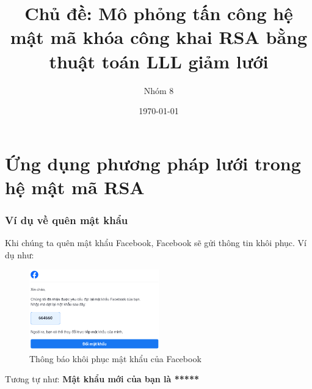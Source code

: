 \documentclass{beamer}
\title[{\makebox[.15\paperwidth]{MI4100 - Mật mã và độ phức tạp thuật toán}}]{Chủ đề: Mô phỏng tấn công hệ mật mã khóa công khai RSA bằng thuật toán LLL giảm lưới}
\author[Nhóm 8]{Nhóm 8}
\date[\today]{\today}
\numberwithin{equation}{section}
\begin{document}
\begin{frame}
\titlepage
\end{frame}






 
\section{Ứng dụng phương pháp lưới trong hệ mật mã RSA}
\begin{frame}
    \frametitle{Ví dụ về quên mật khẩu}
    Khi chúng ta quên mật khẩu Facebook, Facebook sẽ gửi thông tin khôi phục. Ví dụ như:

    \begin{figure}
        \includegraphics[width=0.5\textwidth]{pictures/facebook.png}
        \caption{Thông báo khôi phục mật khẩu của Facebook}
    \end{figure}

    Tương tự như:
    \textbf{Mật khẩu mới của bạn là *****}
\end{frame}
\end{document}
